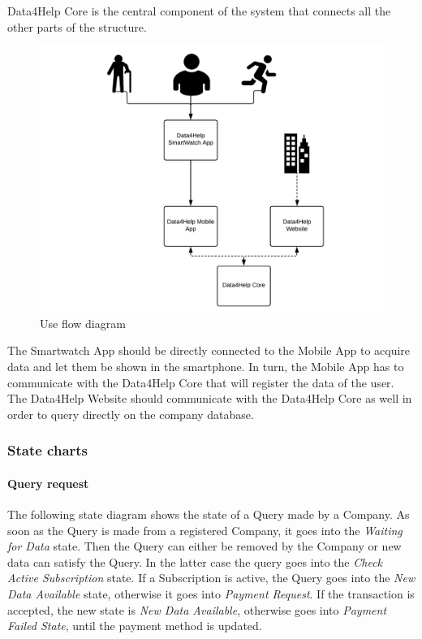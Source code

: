 Data4Help Core is the central component of the system that connects all the other parts of the structure.

\begin{figure}[H]
	\includegraphics[width=\textwidth,height=\textheight,keepaspectratio]{assets/useflow.pdf}
	\caption{Use flow diagram}
	\label{fig:useflow}
\end{figure}

The Smartwatch App should be directly connected to the Mobile App to acquire data and let them be shown in the smartphone. In turn, the Mobile App has to communicate with the Data4Help Core that will register the data of the user. The Data4Help Website should communicate with the Data4Help Core as well in order to query directly on the company database.
\newline

\subsubsection{State charts}

\paragraph{Query request}
The following state diagram shows the state of a Query made by a Company. As soon as the Query is made from a registered Company, it goes into the \textit{Waiting for Data} state. Then the Query can either be removed by the Company or new data can satisfy the Query. In the latter case the query goes into the \textit{Check Active Subscription} state. If a Subscription is active, the Query goes into the \textit{New Data Available} state, otherwise it goes into \textit{Payment Request}. If the transaction is accepted, the new state is \textit{New Data Available}, otherwise goes into \textit{Payment Failed State}, until the payment method is updated.

